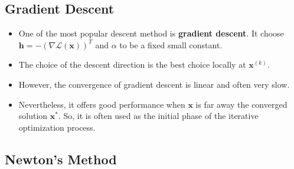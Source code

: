 \documentclass[10pt]{article}
\newcommand{\ve}[1]{\mathbf{#1}}
\newcommand{\mcal}[1]{\mathcal{#1}}
\begin{document}
\subsection{Gradient Descent}

\begin{itemize}
    \item One of the most popular descent method is {\bf gradient descent}. It choose $\ve{h} = -(\nabla \mcal{L}(\ve{x}))^T$  and $\alpha$ to be a fixed small constant.
    
    \item The choice of the descent direction is the best choice locally at $\ve{x}^{(k)}$.
    
    \item However, the convergence of gradient descent is linear and often very slow.
    
    \item Nevertheless, it offers good performance when $\ve{x}$ is far away the converged solution $\ve{x}^*$. So, it is often used as the initial phase of the iterative optimization process.
\end{itemize}

\subsection{Newton's Method}
\end{document}
